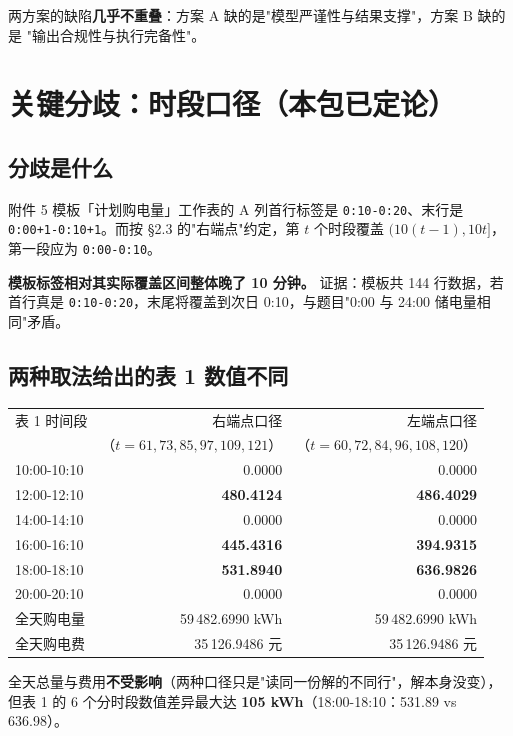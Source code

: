 \documentclass[12pt,a4paper]{ctexart}
\begin{document}
两方案的缺陷\textbf{几乎不重叠}：方案 A 缺的是"模型严谨性与结果支撑"，方案 B 缺的是
"输出合规性与执行完备性"。

\section{关键分歧：时段口径（本包已定论）}

\subsection{分歧是什么}

附件 5 模板「计划购电量」工作表的 A 列首行标签是 \texttt{0:10-0:20}、末行是
\texttt{0:00+1-0:10+1}。而按 \S2.3 的"右端点"约定，第 $t$ 个时段覆盖 $(10(t-1),10t]$，
第一段应为 \texttt{0:00-0:10}。

\textbf{模板标签相对其实际覆盖区间整体晚了 10 分钟。} 证据：模板共 144 行数据，若首行真是
\texttt{0:10-0:20}，末尾将覆盖到次日 0:10，与题目"0:00 与 24:00 储电量相同"矛盾。

\subsection{两种取法给出的表 1 数值不同}

\begin{center}
\begin{tabular}{@{}l r r@{}}
\toprule
表 1 时间段 & 右端点口径 & 左端点口径 \\
 & （$t=61,73,85,97,109,121$） & （$t=60,72,84,96,108,120$） \\
\midrule
10:00-10:10 & 0.0000 & 0.0000 \\
12:00-12:10 & \textbf{480.4124} & \textbf{486.4029} \\
14:00-14:10 & 0.0000 & 0.0000 \\
16:00-16:10 & \textbf{445.4316} & \textbf{394.9315} \\
18:00-18:10 & \textbf{531.8940} & \textbf{636.9826} \\
20:00-20:10 & 0.0000 & 0.0000 \\
\midrule
全天购电量 & 59\,482.6990 kWh & 59\,482.6990 kWh \\
全天购电费 & 35\,126.9486 元 & 35\,126.9486 元 \\
\bottomrule
\end{tabular}
\end{center}

\noindent\small 全天总量与费用\textbf{不受影响}（两种口径只是"读同一份解的不同行"，解本身没变），
但表 1 的 6 个分时段数值差异最大达 \textbf{105 kWh}（18:00-18:10：531.89 vs 636.98）。
\end{document}
